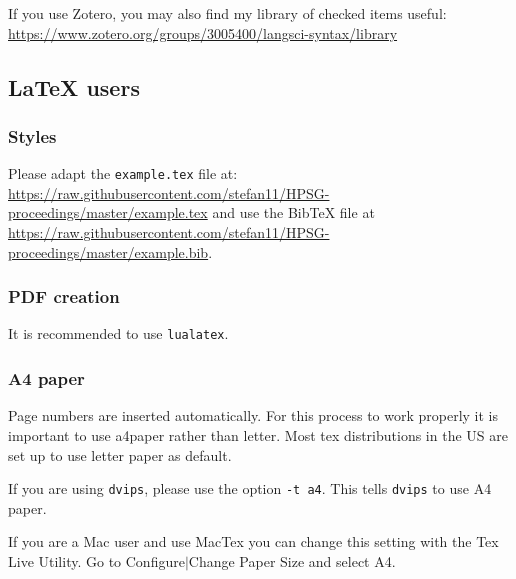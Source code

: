 \documentclass[11pt,a4paper,fleqn]{article}
\begin{document}
If you use Zotero, you may also find my library of checked items useful:
\url{https://www.zotero.org/groups/3005400/langsci-syntax/library}

\subsection{\LaTeX{} users}

\subsubsection{Styles}

Please adapt the \verb+example.tex+ file at:\newline
\url{https://raw.githubusercontent.com/stefan11/HPSG-proceedings/master/example.tex}\newline
and use the BibTeX file at \url{https://raw.githubusercontent.com/stefan11/HPSG-proceedings/master/example.bib}.

\subsubsection{PDF creation}

It is recommended to use \verb+lualatex+. 
%
%


\subsubsection{A4 paper}

Page numbers are inserted automatically. For this process to work properly it is important to use
a4paper rather than letter. Most tex distributions in the US are set up to use letter paper as default.

If you are using \verb+dvips+, please use the option \verb+-t a4+. This tells
\verb+dvips+ to use A4 paper.


If you are a Mac user and use MacTex you can change this setting with the Tex Live Utility. Go to
Configure$|$Change Paper Size and select A4.
\end{document}
